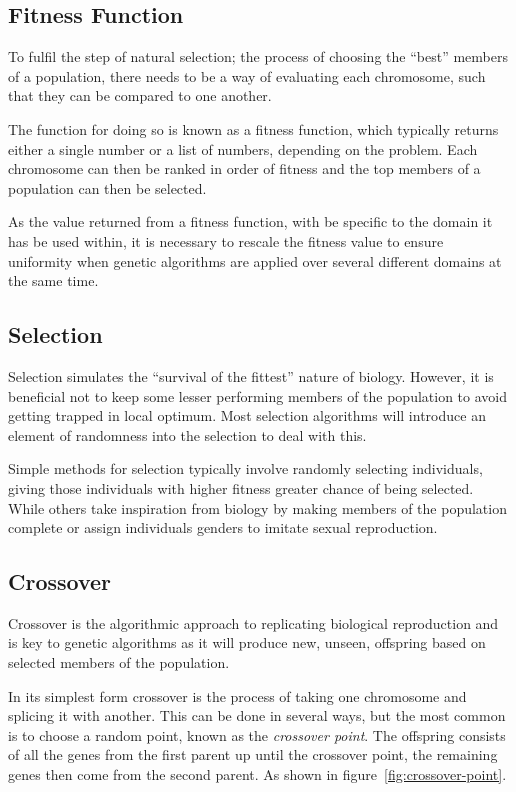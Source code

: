 \documentclass[10pt, a4paper]{article}
\begin{document}
\subsection{Fitness Function}
To fulfil the step of natural selection; the process of choosing the ``best''
members of a population, there needs to be a way of evaluating each chromosome,
such that they can be compared to one another.

The function for doing so is known as a fitness function, which typically 
returns either a single number or a list of numbers, depending on the problem.
Each chromosome can then be ranked in order of fitness and the top members of
a population can then be selected.

As the value returned from a fitness function, with be specific to the domain 
it has be used within, it is necessary to rescale the fitness value to ensure 
uniformity when genetic algorithms are applied over several different domains
at the same time.


\subsection{Selection}
Selection simulates the ``survival of the fittest'' nature of biology. However,
it is beneficial not to keep some lesser performing members of the population
to avoid getting trapped in local optimum. Most selection algorithms will 
introduce an element of randomness into the selection to deal with this.

Simple methods for selection typically involve randomly selecting individuals,
giving those individuals with higher fitness greater chance of being selected.
While others take inspiration from biology by making members of the population
complete or assign individuals genders to imitate sexual reproduction.

\subsection{Crossover}

Crossover is the algorithmic approach to replicating biological reproduction
and is key to genetic algorithms as it will produce new, unseen, offspring
based on selected members of the population.

In its simplest form crossover is the process of taking one chromosome and
splicing it with another. This can be done in several ways, but the most common
is to choose a random point, known as the \textit{crossover point}. The
offspring consists of all the genes from the first parent up until the 
crossover point, the remaining genes then come from the second parent. As shown
in figure~\ref{fig:crossover-point}.
\end{document}
